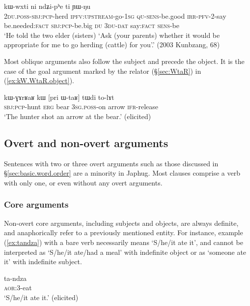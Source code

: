 \begin{exe}
\ex \label{ex:O.ndZiphe}
\gll [nɯ-kɯ-lɤɣ lu-ɕe-a ɯ-ɲɯ́-pe a-tɤ-tɯ-ti ra] kɯ-wxti ni ndʑi-pʰe ti ɲɯ-ŋu\\
\textsc{2du}.\textsc{poss}-\textsc{sbj}:\textsc{pcp}-herd \textsc{ipfv}:\textsc{upstream}-go-\textsc{1sg} \textsc{qu}-\textsc{sens}-be.good \textsc{irr}-\textsc{pfv}-2-say be.needed:\textsc{fact}  \textsc{sbj}:\textsc{pcp}-be.big \textsc{du} \textsc{3du}-\textsc{dat} say:\textsc{fact} \textsc{sens}-be\\
\glt `He told the two elder (sisters) `Ask (your parents) whether it would be appropriate for me to go herding (cattle) for you'.' (2003 Kunbzang, 68)
\end{exe}

Most oblique arguments also follow the subject and precede the object. It is the case of the goal argument marked by the relator  (§\ref{sec:WtaR}) in (\ref{ex:kW.WtaR.object}).

\begin{exe}
\ex \label{ex:kW.WtaR.object}
\gll  kɯ-ɣɤrʁaʁ kɯ [pri ɯ-taʁ] tɯdi to-lɤt \\
\textsc{sbj}:\textsc{pcp}-hunt \textsc{erg} bear \textsc{3sg}.\textsc{poss}-on arrow \textsc{ifr}-release \\
\glt `The hunter shot an arrow at the bear.' (elicited)
\end{exe}

\subsection{Overt and non-overt arguments} \label{sec:overt.non.overt}
Sentences with two or three overt arguments such as those discussed in §\ref{sec:basic.word.order} are a minority in Japhug. Most clauses comprise a verb with only one, or even without any overt arguments.

\subsubsection{Core arguments} \label{sec:nonovert.core.arguments}
Non-overt core arguments, including subjects and objects, are always definite, and anaphorically refer to a previously mentioned entity. For instance, example (\ref{ex:tandza}) with a bare verb necessarily means `S/he/it ate it', and cannot be interpreted as `S/he/it ate/had a meal' with indefinite object or as `someone ate it' with indefinite subject.

\begin{exe}
\ex \label{ex:tandza}
\gll ta-ndza \\
\textsc{aor}:3\flobv{}-eat \\
\glt `S/he/it ate it.' (elicited)
\end{exe}

